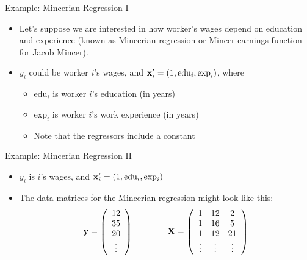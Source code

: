\documentclass[aspectratio=169,11pt]{beamer}
\begin{document}
\begin{frame}{Example: Mincerian Regression I}
\begin{itemize}
	\item Let's suppose we are interested in how worker's wages depend on education and experience
	(known as Mincerian regression or Mincer earnings function for Jacob Mincer).

	\medskip
	\item $y_{i}$ could be worker $i$'s wages, and ${\bf x}_i' = \left(1,\text{edu}_i,\text{exp}_i \right)$, 
	where 
	\begin{itemize}
		\item $\text{edu}_i$ is worker $i$'s education (in years)
		\item $\text{exp}_i$ is worker $i$'s work experience (in years)
		\item Note that the regressors include a constant 
	\end{itemize}
\end{itemize}
\end{frame}

\begin{frame}{Example: Mincerian Regression II}
\begin{itemize}
	\item $y_{i}$ is $i$'s wages, and ${\bf x}_i' = \left(1,\text{edu}_i,\text{exp}_i \right)$

	\medskip
	\item The data matrices for the Mincerian regression might look like this:
\[
{\bf y}=\left(\begin{array}{c}
12\\
35\\
20\\
\vdots
\end{array}\right)\qquad\qquad{\bf X}=\left(\begin{array}{ccc}
1 & 12 & 2\\
1 & 16 & 5\\
1 & 12 & 21\\
\vdots & \vdots & \vdots
\end{array}\right)
\]
\end{itemize}
\end{frame}
\end{document}
